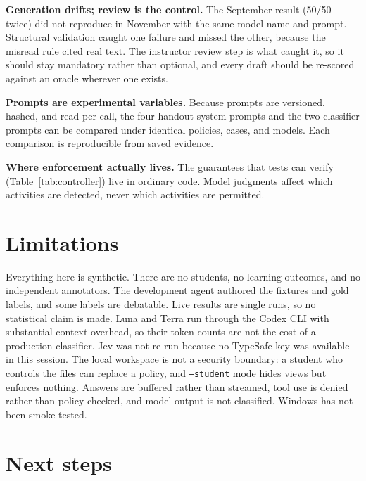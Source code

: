 \documentclass[11pt,letterpaper]{article}
\begin{document}
\textbf{Generation drifts; review is the control.} The September result (50/50 twice) did not reproduce in November with the same model name and prompt. Structural validation caught one failure and missed the other, because the misread rule cited real text. The instructor review step is what caught it, so it should stay mandatory rather than optional, and every draft should be re-scored against an oracle wherever one exists.

\textbf{Prompts are experimental variables.} Because prompts are versioned, hashed, and read per call, the four handout system prompts and the two classifier prompts can be compared under identical policies, cases, and models. Each comparison is reproducible from saved evidence.

\textbf{Where enforcement actually lives.} The guarantees that tests can verify (Table~\ref{tab:controller}) live in ordinary code. Model judgments affect which activities are detected, never which activities are permitted.

\section{Limitations}

Everything here is synthetic. There are no students, no learning outcomes, and no independent annotators. The development agent authored the fixtures and gold labels, and some labels are debatable. Live results are single runs, so no statistical claim is made. Luna and Terra run through the Codex CLI with substantial context overhead, so their token counts are not the cost of a production classifier. Jev was not re-run because no TypeSafe key was available in this session. The local workspace is not a security boundary: a student who controls the files can replace a policy, and \texttt{--student} mode hides views but enforces nothing. Answers are buffered rather than streamed, tool use is denied rather than policy-checked, and model output is not classified. Windows has not been smoke-tested.

\section{Next steps}
\end{document}
